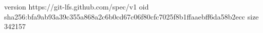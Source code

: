 version https://git-lfs.github.com/spec/v1
oid sha256:bfa9ab93a39c355a868a2c6b0cd67c06f80cfc7025f8b1ffaaebff6da58b2ecc
size 342157
